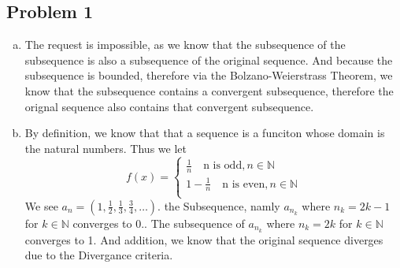 \documentclass[12pt]{article}
\begin{document}
\subsection*{Problem 1}
\begin{enumerate}[a).]
    \item {
    The request is impossible, as we know that the subsequence of the subsequence is also a subsequence of the original sequence. 
    And because the subsequence is bounded, therefore via the Bolzano-Weierstrass Theorem, we know that the subsequence contains a convergent subsequence, therefore the orignal sequence also contains that convergent subsequence.
    }
    \item {
    By definition, we know that that a sequence is a funciton whose domain is the natural numbers.
    Thus we let 
        $$ 
        f(x) = \left\{ 
            \begin{array}{ll} 
                \frac{1}{n} \quad \text{n is odd}, n \in \mathbb{N}\\
                1 - \frac{1}{n} \quad \text{n is even}, n \in \mathbb{N} \\
            \end{array} \right.
        $$
    We see $a_n = (1,\frac{1}{2},\frac{1}{3}, \frac{3}{4}, \dots)$.
    the Subsequence, namly $a_{n_k}$ where $n_k = 2k - 1$ for $k \in \mathbb{N}$ converges to 0..
    The subsequence of $a_{n_k}$ where $n_k = 2k $ for $k \in \mathbb{N}$ converges to 1. 
    And addition, we know that the original sequence diverges due to the Divergance criteria. 
    }
\end{enumerate}
\end{document}
